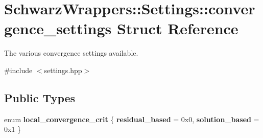 \hypertarget{structSchwarzWrappers_1_1Settings_1_1convergence__settings}{}\section{Schwarz\+Wrappers\+:\+:Settings\+:\+:convergence\+\_\+settings Struct Reference}
\label{structSchwarzWrappers_1_1Settings_1_1convergence__settings}


The various convergence settings available.  




{\ttfamily \#include $<$settings.\+hpp$>$}

\subsection*{Public Types}
\begin{DoxyCompactItemize}
\item 
\mbox{\label{structSchwarzWrappers_1_1Settings_1_1convergence__settings_a5b35e2169c8a165611849d2466f459fe}} 
enum {\bfseries local\+\_\+convergence\+\_\+crit} \{ {\bfseries residual\+\_\+based} = 0x0, 
{\bfseries solution\+\_\+based} = 0x1
 \}
\end{DoxyCompactItemize}
